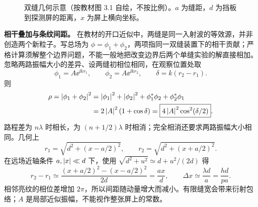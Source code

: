 \begin{figure}[htbp]
  \centering
  \caption{双缝几何示意（按教材图 3.1 自绘，不按比例）。$a$ 为缝距，$d$ 为挡板到探测屏的距离，$x$ 为屏上横向坐标。}
  \label{fig:QM-C05-S05-geometry}
\end{figure}

\textbf{相干叠加与条纹间距。}
在教材的开口近似中，两缝是同一入射波的等效源，并非创造两个新粒子。写总场为 $\phi=\phi_1+\phi_2$，两项指同一双缝装置下的相干贡献；严格计算须解整个边界问题，不能一般地把改变边界后两个单缝实验的解直接相加。忽略两路振幅大小的差异、设两缝初相位相同，在观察位置处取
\begin{equation}
  \phi_1=A\ee^{\ii kr_1},\qquad
  \phi_2=A\ee^{\ii kr_2},\qquad
  \delta=k(r_2-r_1).
\end{equation}
则
\begin{align}
  \rho=\left|\phi_1+\phi_2\right|^2
  &=\left|\phi_1\right|^2+\left|\phi_2\right|^2
    +\phi_1^*\phi_2+\phi_2^*\phi_1\\
  &=2\left|A\right|^2(1+\cos\delta)
   =\boxed{4\left|A\right|^2\cos^2(\delta/2)}.
  \label{eq:QM-C05-S05-interference}
\end{align}
路程差为 $n\lambda$ 时相长，为 $(n+1/2)\lambda$ 时相消；完全相消还要求两路振幅大小相同。几何上
\begin{equation}
  r_1=\sqrt{d^2+(x-a/2)^2},\qquad
  r_2=\sqrt{d^2+(x+a/2)^2}.
\end{equation}
在远场近轴条件 $a,\left|x\right|\ll d$ 下，使用 $\sqrt{d^2+u^2}\simeq d+u^2/(2d)$ 得
\begin{equation}
  r_2-r_1\simeq\frac{(x+a/2)^2-(x-a/2)^2}{2d}
  =\frac{ax}{d},\qquad
  \boxed{\Delta x\simeq\frac{\lambda d}{a}=\frac{hd}{pa}}.
  \label{eq:QM-C05-S05-fringe-spacing}
\end{equation}
相邻亮纹的相位差增加 $2\pi$，所以间距随动量增大而减小。有限缝宽会带来衍射包络；$A$ 是局部近似振幅，不能视作整张屏上的常数。

